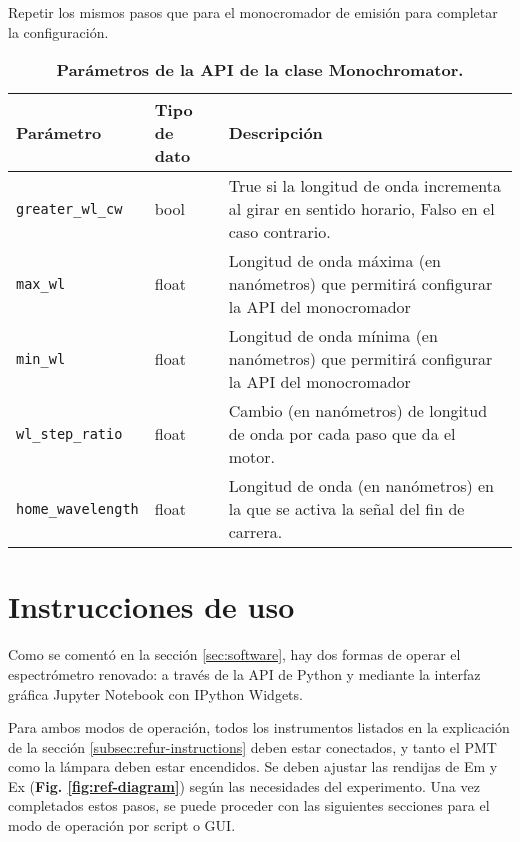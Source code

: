 Repetir los mismos pasos que para el monocromador de emisión para completar la configuración.

\begin{table}[h]
 \centering
 \begin{tabular}{|l|l|p{10cm}|}
    \hline
    \textbf{Parámetro} & \textbf{Tipo de dato} & \textbf{Descripción} \\ \hline
    \texttt{greater\_wl\_cw}          & bool               & True si la longitud de onda incrementa al girar en sentido horario, Falso en el caso contrario. \\ \hline
    \texttt{max\_wl}                 & float              & Longitud de onda máxima (en nanómetros) que permitirá configurar la API del monocromador \\ \hline
    \texttt{min\_wl}                 & float              & Longitud de onda mínima (en nanómetros) que permitirá configurar la API del monocromador \\ \hline
    \texttt{wl\_step\_ratio}          & float              & Cambio (en nanómetros) de longitud de onda por cada paso que da el motor.\\ \hline
    \texttt{home\_wavelength}        & float              & Longitud de onda (en nanómetros) en la que se activa la señal del fin de carrera. \\ \hline
\end{tabular}
\caption{\textbf{Parámetros de la API de la clase Monochromator.}}
\label{tab:monochromator_api_parameters}
\end{table}

\section{Instrucciones de uso} \label{apendice:instrucciones_uso}

Como se comentó en la sección \ref{sec:software}, hay dos formas de operar el espectrómetro renovado: a través de la API de Python y mediante la interfaz gráfica Jupyter Notebook con IPython Widgets. 

Para ambos modos de operación, todos los instrumentos listados en la explicación de la sección \ref{subsec:refur-instructions} deben estar conectados, y tanto el PMT como la lámpara deben estar encendidos. 
Se deben ajustar las rendijas de Em y Ex (\textbf{Fig. \ref{fig:ref-diagram}}) según las necesidades del experimento. 
Una vez completados estos pasos, se puede proceder con las siguientes secciones para el modo de operación por script o GUI.

